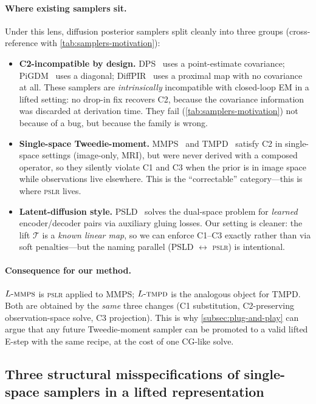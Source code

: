 \documentclass{article}
\theoremstyle{plain}
\theoremstyle{definition}
\theoremstyle{remark}
\newcommand{\tsimg}{\mathcal{T}}
\newcommand{\pslr}{\textsc{pslr}}
\newcommand{\lmmps}{L\mbox{-}\textsc{mmps}}
\newcommand{\ltmpd}{L\mbox{-}\textsc{tmpd}}
\begin{document}
\paragraph{Where existing samplers sit.}
Under this lens, diffusion posterior samplers split cleanly into three groups (cross-reference with \cref{tab:samplers-motivation}):
\begin{itemize}
\setlength{\itemsep}{0pt}
\item \textbf{C2-incompatible by design.} DPS~\citep{chung2023dps} uses a point-estimate covariance; PiGDM~\citep{song2023pigdm} uses a diagonal; DiffPIR~\citep{zhu2023diffpir} uses a proximal map with no covariance at all. These samplers are \emph{intrinsically} incompatible with closed-loop EM in a lifted setting: no drop-in fix recovers C2, because the covariance information was discarded at derivation time. They fail (\cref{tab:samplers-motivation}) not because of a bug, but because the family is wrong.
\item \textbf{Single-space Tweedie-moment.} MMPS~\citep{rozet2024diem} and TMPD~\citep{boys2023tmpd} satisfy C2 in single-space settings (image-only, MRI), but were never derived with a composed operator, so they silently violate C1 and C3 when the prior is in image space while observations live elsewhere. This is the ``correctable'' category---this is where \pslr{} lives.
\item \textbf{Latent-diffusion style.} PSLD~\citep{rout2024psld} solves the dual-space problem for \emph{learned} encoder/decoder pairs via auxiliary gluing losses. Our setting is cleaner: the lift $\tsimg$ is a \emph{known linear map}, so we can enforce C1--C3 exactly rather than via soft penalties---but the naming parallel (PSLD $\leftrightarrow$ \pslr{}) is intentional.
\end{itemize}

\paragraph{Consequence for our method.}
$\lmmps$ is \pslr{} applied to MMPS; $\ltmpd$ is the analogous object for TMPD. Both are obtained by the \emph{same} three changes (C1 substitution, C2-preserving observation-space solve, C3 projection). This is why \cref{subsec:plug-and-play} can argue that any future Tweedie-moment sampler can be promoted to a valid lifted E-step with the same recipe, at the cost of one CG-like solve.

\vspace{-1mm}
\subsection{Three structural misspecifications of single-space samplers in a lifted representation}
\label{subsec:misspec}
\vspace{-1mm}
\end{document}
